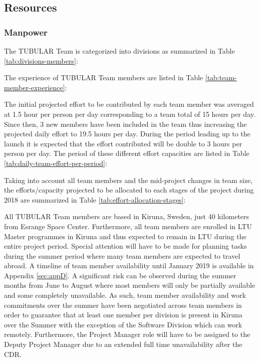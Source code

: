 \subsection{Resources}

\subsubsection{Manpower}
The TUBULAR Team is categorized into divisions as summarized in Table \ref{tab:divisions-members}:



The experience of TUBULAR Team members are listed in Table \ref{tab:team-member-experience}:



The initial projected effort to be contributed by each team member was averaged at 1.5 hour per person per day corresponding to a team total of 15 hours per day. Since then, 3 new members have been included in the team thus increasing the projected daily effort to 19.5 hours per day. During the period leading up to the launch it is expected that the effort contributed will be double to 3 hours per person per day. The period of these different effort capacities are listed in Table \ref{tab:daily-team-effort-per-period}:



Taking into account all team members and the mid-project changes in team size, the efforts/capacity projected to be allocated to each stages of the project during 2018 are summarized in Table \ref{tab:effort-allocation-stages}:



All TUBULAR Team members are based in Kiruna, Sweden, just 40 kilometers from Esrange Space Center. Furthermore, all team members are enrolled in LTU Master programmes in Kiruna and thus expected to remain in LTU during the entire project period. Special attention will have to be made for planning tasks during the summer period where many team members are expected to travel abroad. A timeline of team member availability  until January 2019 is available in Appendix \ref{sec:appD}. A significant risk can be observed during the summer months from June to August where most members will only be partially available and some completely unavailable. As such, team member availability and work commitments over the summer have been negotiated across team members in order to guarantee that at least one member per division is present in Kiruna over the Summer with the exception of the Software Division which can work remotely. Furthermore, the Project Manager role will have to be assigned to the Deputy Project Manager due to an extended full time unavailability after the CDR.

